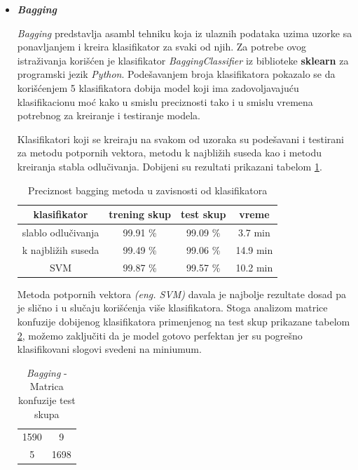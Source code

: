 \documentclass[a4paper]{article}
\begin{document}
\begin{itemize}
\item \textbf{\textit{Bagging}}

\textit{Bagging} predstavlja asambl tehniku koja iz ulaznih podataka uzima uzorke sa ponavljanjem i kreira klasifikator za svaki od njih. Za potrebe ovog istraživanja korišćen je klasifikator \textit{BaggingClassifier} iz biblioteke \textbf{sklearn} za programski jezik \textit{Python}. Podešavanjem broja klasifikatora pokazalo se da korišćenjem 5 klasifikatora dobija model koji ima zadovoljavajuću klasifikacionu moć kako u smislu preciznosti tako i u smislu vremena potrebnog za kreiranje i testiranje modela.

Klasifikatori koji se kreiraju na svakom od 
uzoraka su podešavani i testirani za metodu 
potpornih vektora, metodu k najbližih suseda kao 
i metodu kreiranja stabla odlučivanja. Dobijeni 
su rezultati prikazani tabelom \ref{table:bagging}.


\begin{table}[h!]
\centering
\begin{tabular}{|c c c c|} 
 \hline
  klasifikator & trening skup & test skup & vreme 
  \\ [0.5ex] 
 \hline
 slablo odlučivanja & 99.91 \% &  99.09 \% & 3.7 min \\
 k najbližih suseda & 99.49 \% &  99.06 \% & 14.9 min \\
 SVM &  99.87 \% &  99.57 \% & 10.2 min \\
 \hline
\end{tabular}
\caption{Preciznost bagging metoda u zavisnosti od klasifikatora}
\label{table:bagging}
\end{table}

Metoda potpornih vektora \textit{(eng. SVM)} 
davala je najbolje rezultate dosad pa je slično i u slučaju korišćenja više klasifikatora. Stoga 
analizom matrice konfuzije dobijenog 
klasifikatora primenjenog na test skup prikazane tabelom \ref{table:bagkonf}, možemo zaključiti da je model gotovo perfektan jer su pogrešno klasifikovani slogovi svedeni na miniumum.

\begin{table}[h!]
\centering
\begin{tabular}{|c c|}
  \hline
  1590 & 9 \\
  5 & 1698  \\
 \hline
\end{tabular}
\caption{\textit{Bagging} - Matrica konfuzije test skupa}
\label{table:bagkonf}
\end{table}


\end{itemize}
\end{document}
